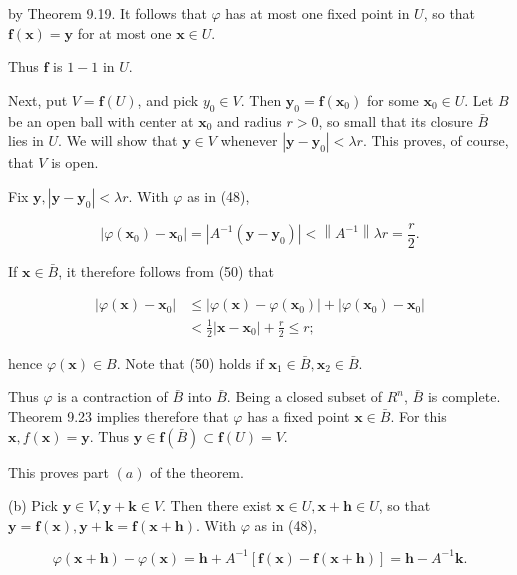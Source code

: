 \documentclass[10pt]{article}
\begin{document}
by Theorem 9.19. It follows that $\varphi$ has at most one fixed point in $U$, so that $\mathbf{f}(\mathbf{x})=\mathbf{y}$ for at most one $\mathbf{x} \in U$.

Thus $\mathbf{f}$ is $1-1$ in $U$.

Next, put $V=\mathbf{f}(U)$, and pick $y_{0} \in V$. Then $\mathbf{y}_{0}=\mathbf{f}\left(\mathbf{x}_{0}\right)$ for some $\mathbf{x}_{0} \in U$. Let $B$ be an open ball with center at $\mathbf{x}_{0}$ and radius $r>0$, so small that its closure $\bar{B}$ lies in $U$. We will show that $\mathbf{y} \in V$ whenever $\left|\mathbf{y}-\mathbf{y}_{0}\right|<\lambda r$. This proves, of course, that $V$ is open.

Fix $\mathbf{y},\left|\mathbf{y}-\mathbf{y}_{0}\right|<\lambda r$. With $\varphi$ as in (48),

$$
\left|\varphi\left(\mathbf{x}_{0}\right)-\mathbf{x}_{0}\right|=\left|A^{-1}\left(\mathbf{y}-\mathbf{y}_{0}\right)\right|<\left\|A^{-1}\right\| \lambda r=\frac{r}{2} .
$$

If $\mathbf{x} \in \bar{B}$, it therefore follows from (50) that

$$
\begin{aligned}
\left|\varphi(\mathbf{x})-\mathbf{x}_{0}\right| & \leq\left|\varphi(\mathbf{x})-\varphi\left(\mathbf{x}_{0}\right)\right|+\left|\varphi\left(\mathbf{x}_{0}\right)-\mathbf{x}_{0}\right| \\
& <\frac{1}{2}\left|\mathbf{x}-\mathbf{x}_{0}\right|+\frac{r}{2} \leq r ;
\end{aligned}
$$

hence $\varphi(\mathbf{x}) \in B$. Note that (50) holds if $\mathbf{x}_{1} \in \bar{B}, \mathbf{x}_{2} \in \bar{B}$.

Thus $\varphi$ is a contraction of $\bar{B}$ into $\bar{B}$. Being a closed subset of $R^{n}$, $\bar{B}$ is complete. Theorem 9.23 implies therefore that $\varphi$ has a fixed point $\mathbf{x} \in \bar{B}$. For this $\mathbf{x}, f(\mathbf{x})=\mathbf{y}$. Thus $\mathbf{y} \in \mathbf{f}(\bar{B}) \subset \mathbf{f}(U)=V$.

This proves part $(a)$ of the theorem.

(b) Pick $\mathbf{y} \in V, \mathbf{y}+\mathbf{k} \in V$. Then there exist $\mathbf{x} \in U, \mathbf{x}+\mathbf{h} \in U$, so that $\mathbf{y}=\mathbf{f}(\mathbf{x}), \mathbf{y}+\mathbf{k}=\mathbf{f}(\mathbf{x}+\mathbf{h})$. With $\varphi$ as in (48),

$$
\varphi(\mathbf{x}+\mathbf{h})-\varphi(\mathbf{x})=\mathbf{h}+A^{-1}[\mathbf{f}(\mathbf{x})-\mathbf{f}(\mathbf{x}+\mathbf{h})]=\mathbf{h}-A^{-1} \mathbf{k} .
$$
\end{document}
